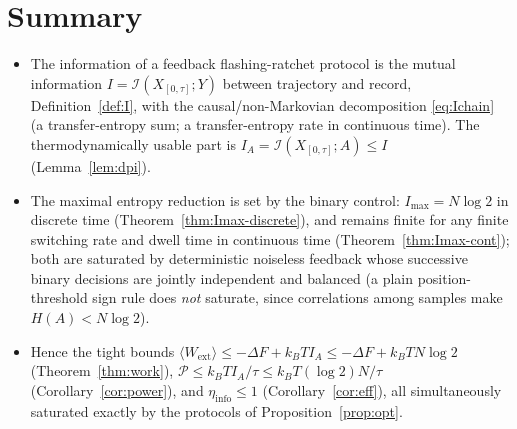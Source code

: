 \documentclass{amsart}
\theoremstyle{definition}
\newcommand{\kB}{k_{B}}
\newcommand{\Wext}{\langle W_{\mathrm{ext}}\rangle}
\begin{document}
\section*{Summary}
\begin{itemize}
\item[(a)] The information of a feedback flashing-ratchet protocol is the
mutual information $I=\mathcal I(X_{[0,\tau]};Y)$ between trajectory and
record, Definition~\ref{def:I}, with the causal/non-Markovian decomposition
\eqref{eq:Ichain} (a transfer-entropy sum; a transfer-entropy rate in
continuous time). The thermodynamically usable part is
$I_A=\mathcal I(X_{[0,\tau]};A)\le I$ (Lemma~\ref{lem:dpi}).
\item[(b)] The maximal entropy reduction is set by the binary control:
$I_{\max}=N\log2$ in discrete time (Theorem~\ref{thm:Imax-discrete}), and
remains finite for any finite switching rate and dwell time in continuous time
(Theorem~\ref{thm:Imax-cont}); both are saturated by deterministic noiseless feedback whose successive
binary decisions are jointly independent and balanced (a plain
position-threshold sign rule does \emph{not} saturate, since correlations among
samples make $H(A)<N\log2$).
\item[(c)] Hence the tight bounds
$\Wext\le -\Delta F+\kB T I_A\le -\Delta F+\kB T N\log2$
(Theorem~\ref{thm:work}),
$\mathcal P\le \kB T I_A/\tau\le \kB T(\log2)N/\tau$
(Corollary~\ref{cor:power}), and $\eta_{\mathrm{info}}\le1$
(Corollary~\ref{cor:eff}), all simultaneously saturated exactly by the
protocols of Proposition~\ref{prop:opt}.
\end{itemize}
\end{document}
